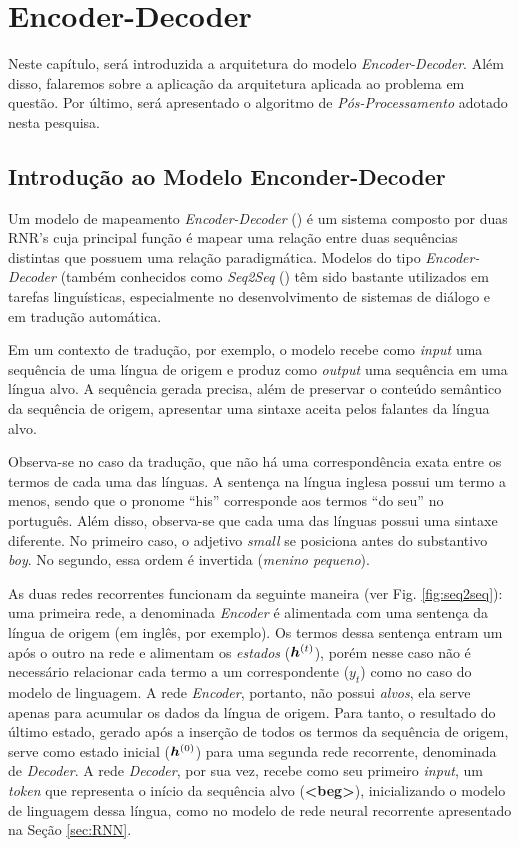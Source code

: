 \chapter{Encoder-Decoder}
\label{ch:05}

Neste capítulo, será introduzida a arquitetura do modelo \textit{Encoder-Decoder}. Além disso, falaremos sobre a aplicação da arquitetura aplicada ao problema em questão. Por último, será apresentado o algoritmo de \textit{Pós-Processamento} adotado nesta pesquisa.

\section{Introdução ao Modelo Enconder-Decoder}
\label{sec:intro-sec-sec}
Um modelo de mapeamento \textit{Encoder-Decoder} (\cite{enc-dec:2014}) é um sistema composto por duas RNR's cuja principal função é mapear uma relação entre duas sequências distintas que possuem uma relação paradigmática. Modelos do tipo \textit{Encoder-Decoder} (também conhecidos como \textit{Seq2Seq} (\cite{seq2seq:2014}) têm sido bastante utilizados em tarefas linguísticas, especialmente no desenvolvimento de sistemas de diálogo e em tradução automática.

Em um contexto de tradução, por exemplo, o modelo recebe como \textit{input }uma sequência de uma língua de origem e produz como \textit{output} uma sequência em uma língua alvo. A sequência gerada precisa, além de preservar o conteúdo semântico da sequência de origem, apresentar uma sintaxe aceita pelos falantes da língua alvo. 


Observa-se no caso da tradução, que não há uma correspondência exata entre os termos de cada uma das línguas. A sentença na língua inglesa possui um termo a menos, sendo que o pronome “his” corresponde aos termos “do seu” no português. Além disso, observa-se que cada uma das línguas possui uma sintaxe diferente. No primeiro caso, o adjetivo \textit{small} se posiciona antes do substantivo \textit{boy}. No segundo, essa ordem é invertida (\textit{menino pequeno}). 

As duas redes recorrentes funcionam da seguinte maneira (ver Fig. \ref{fig:seq2seq}): uma primeira rede, a denominada \textit{Encoder} é alimentada com uma sentença da língua de origem (em inglês, por exemplo). Os termos dessa sentença entram um após o outro na rede e alimentam os \textit{estados} ($\bm{h}^{(t)}$), porém nesse caso não é necessário relacionar cada termo a um correspondente ($y_t$) como no caso do modelo de linguagem. A rede \textit{Encoder}, portanto, não possui \textit{alvos}, ela serve apenas para acumular os dados da língua de origem. Para tanto, o resultado do último estado, gerado após a inserção de todos os termos da sequência de origem, serve como estado inicial ($\bm{h}^{(0)}$) para uma segunda rede recorrente, denominada de \textit{Decoder}. A rede \textit{Decoder}, por sua vez, recebe como seu primeiro \textit{input}, um \textit{token} que representa o início da sequência alvo (\textbf{<beg>}), inicializando o modelo de linguagem dessa língua, como no modelo de rede neural recorrente apresentado na Seção \ref{sec:RNN}. 

